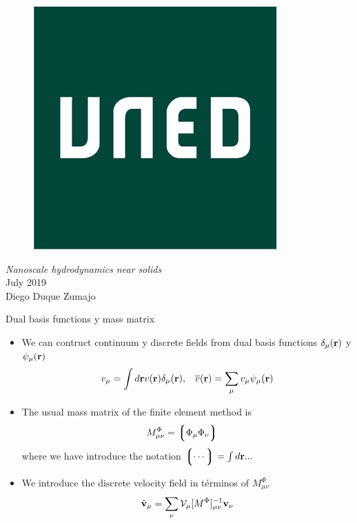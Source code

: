 \documentclass{beamer}
\newcommand{\llg}{\left\lgroup}
\newcommand{\rlg}{\right\rgroup}
\begin{document}
\begin{frame}
\begin{figure}
\includegraphics[width=0.2\linewidth]{logo}
\end{figure}
  \vspace{0.5cm}  
\begin{center}
\textit{Nanoscale hydrodynamics near solids}\\
July 2019\\
Diego Duque Zumajo
\end{center}

\end{frame}

\begin{frame}{Dual basis functions y mass matrix}
  \begin{itemize}
  \item We can contruct continuum y discrete fields from dual basis functions $\delta_{\mu}({\bf r})$ y $\psi_\mu({\bf r})$ 
    \begin{align}
      v_\mu=\int d{\bf r}v({\bf r})\delta_\mu({\bf r}),&&
        \overline{v}({\bf r}) =\sum_{\mu}v_\mu\psi_\mu({\bf r})
    \nonumber
    \end{align}
    \item The usual mass matrix of the finite element method is
      \begin{align}
      M^\Phi_{\mu\nu}&=\llg\Phi_\mu\Phi_\nu\rlg  
      \nonumber
      \end{align}
      where we have introduce the notation $\llg\cdots\rlg=\int d{\bf r}...$
    \item We introduce the discrete velocity field in términos of $M^\Phi_{\mu\nu}$
      \begin{align}
        \tilde{{\bf v}}_{\mu}=\sum_{\nu}{\cal V}_{\mu}[M^{\Phi}]^{-1}_{\mu\nu}{\bf v}_{\nu}
        \nonumber
      \end{align}
  \end{itemize}
\end{frame}
\end{document}

